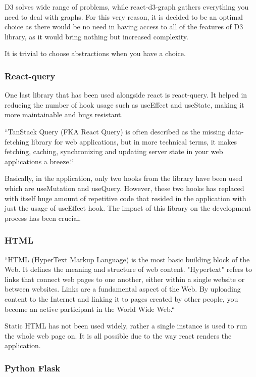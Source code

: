 D3 solves wide range of problems, while react-d3-graph gathers everything you need to deal with graphs. For this very reason, it is decided to be an optimal choice as there would be no need in having access to all of the features of D3 library, as it would bring nothing but increased complexity. 

It is trivial to choose abstractions when you have a choice.

\subsubsection{React-query}

One last library that has been used alongside react is react-query. It helped in reducing the number of hook usage such as useEffect and useState, making it more maintainable and bugs resistant.

``TanStack Query (FKA React Query) is often described as the missing data-fetching library for web applications, but in more technical terms, it makes fetching, caching, synchronizing and updating server state in your web applications a breeze.``~\cite{react-query-web}

Basically, in the application, only two hooks from the library have been used which are useMutation and useQuery. However, these two hooks has replaced with itself huge amount of repetitive code that resided in the application with just the usage of useEffect hook. The impact of this library on the development process has been crucial.

\subsubsection{HTML}

``HTML (HyperText Markup Language) is the most basic building block of the Web. It defines the meaning and structure of web content. "Hypertext" refers to links that connect web pages to one another, either within a single website or between websites. Links are a fundamental aspect of the Web. By uploading content to the Internet and linking it to pages created by other people, you become an active participant in the World Wide Web.``~\cite{html-def}

Static HTML has not been used widely, rather a single instance is used to run the whole web page on. It is all possible due to the way react renders the application.

\subsubsection{Python Flask}

